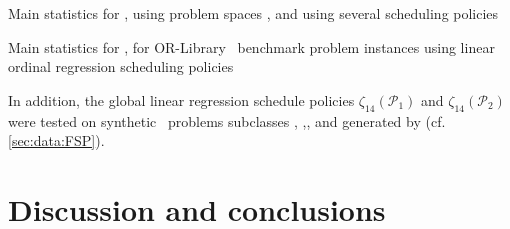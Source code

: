\begin{table}\centering
	\caption{Main statistics for \namerho, using problem spaces ,  and  using several scheduling policies}\label{tbl:comp:p1p2p3:summary}
\end{table}


%
\clearpage
\begin{table}\centering
	\caption{Main statistics for \namerho, for OR-Library \jsp\ benchmark problem instances using linear ordinal regression scheduling policies}\label{tbl:comp:orlibjssp:summary}
\end{table}

In addition, the global linear regression schedule policies $\zeta_{14}(\mathcal{P}_1)$ and $\zeta_{14}(\mathcal{P}_2)$ were tested on synthetic \FSP\ problems subclasses , ,,  and  generated by \citet{Whitley} (cf. \cref{sec:data:FSP}). 

% 
%



\section{Discussion and conclusions}